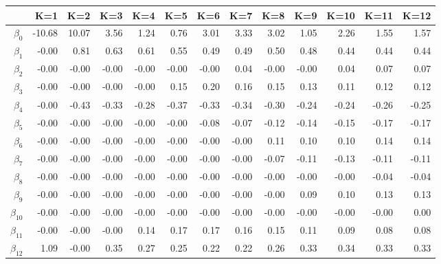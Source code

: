 \begin{table}[ht]
\centering
\begin{tabular}{rrrrrrrrrrrrr}
  \hline
 & K=1 & K=2 & K=3 & K=4 & K=5 & K=6 & K=7 & K=8 & K=9 & K=10 & K=11 & K=12 \\ 
  \hline
$\beta_{0}$ & -10.68 & 10.07 & 3.56 & 1.24 & 0.76 & 3.01 & 3.33 & 3.02 & 1.05 & 2.26 & 1.55 & 1.57 \\ 
  $\beta_{1}$ & -0.00 & 0.81 & 0.63 & 0.61 & 0.55 & 0.49 & 0.49 & 0.50 & 0.48 & 0.44 & 0.44 & 0.44 \\ 
  $\beta_{2}$ & -0.00 & -0.00 & -0.00 & -0.00 & -0.00 & -0.00 & 0.04 & -0.00 & -0.00 & 0.04 & 0.07 & 0.07 \\ 
  $\beta_{3}$ & -0.00 & -0.00 & -0.00 & -0.00 & 0.15 & 0.20 & 0.16 & 0.15 & 0.13 & 0.11 & 0.12 & 0.12 \\ 
  $\beta_{4}$ & -0.00 & -0.43 & -0.33 & -0.28 & -0.37 & -0.33 & -0.34 & -0.30 & -0.24 & -0.24 & -0.26 & -0.25 \\ 
  $\beta_{5}$ & -0.00 & -0.00 & -0.00 & -0.00 & -0.00 & -0.08 & -0.07 & -0.12 & -0.14 & -0.15 & -0.17 & -0.17 \\ 
  $\beta_{6}$ & -0.00 & -0.00 & -0.00 & -0.00 & -0.00 & -0.00 & -0.00 & 0.11 & 0.10 & 0.10 & 0.14 & 0.14 \\ 
  $\beta_{7}$ & -0.00 & -0.00 & -0.00 & -0.00 & -0.00 & -0.00 & -0.00 & -0.07 & -0.11 & -0.13 & -0.11 & -0.11 \\ 
  $\beta_{8}$ & -0.00 & -0.00 & -0.00 & -0.00 & -0.00 & -0.00 & -0.00 & -0.00 & -0.00 & -0.00 & -0.04 & -0.04 \\ 
  $\beta_{9}$ & -0.00 & -0.00 & -0.00 & -0.00 & -0.00 & -0.00 & -0.00 & -0.00 & 0.09 & 0.10 & 0.13 & 0.13 \\ 
  $\beta_{10}$ & -0.00 & -0.00 & -0.00 & -0.00 & -0.00 & -0.00 & -0.00 & -0.00 & -0.00 & -0.00 & -0.00 & 0.00 \\ 
  $\beta_{11}$ & -0.00 & -0.00 & -0.00 & 0.14 & 0.17 & 0.17 & 0.16 & 0.15 & 0.11 & 0.09 & 0.08 & 0.08 \\ 
  $\beta_{12}$ & 1.09 & -0.00 & 0.35 & 0.27 & 0.25 & 0.22 & 0.22 & 0.26 & 0.33 & 0.34 & 0.33 & 0.33 \\ 
   \hline
\end{tabular}
\end{table}
